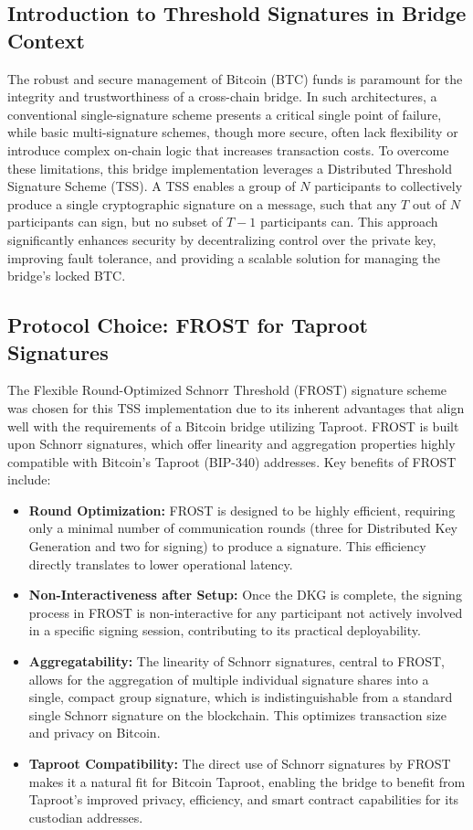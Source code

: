\documentclass{DESSThesis}
\begin{document}
\subsection{Introduction to Threshold Signatures in Bridge Context}
The robust and secure management of Bitcoin (BTC) funds is paramount for the integrity and trustworthiness of a cross-chain bridge. In such architectures, a conventional single-signature scheme presents a critical single point of failure, while basic multi-signature schemes, though more secure, often lack flexibility or introduce complex on-chain logic that increases transaction costs. To overcome these limitations, this bridge implementation leverages a Distributed Threshold Signature Scheme (TSS). A TSS enables a group of $N$ participants to collectively produce a single cryptographic signature on a message, such that any $T$ out of $N$ participants can sign, but no subset of $T-1$ participants can. This approach significantly enhances security by decentralizing control over the private key, improving fault tolerance, and providing a scalable solution for managing the bridge's locked BTC.

\subsection{Protocol Choice: FROST for Taproot Signatures}
The Flexible Round-Optimized Schnorr Threshold (FROST) signature scheme was chosen for this TSS implementation due to its inherent advantages that align well with the requirements of a Bitcoin bridge utilizing Taproot. FROST is built upon Schnorr signatures, which offer linearity and aggregation properties highly compatible with Bitcoin's Taproot (BIP-340) addresses. Key benefits of FROST include:
\begin{itemize}
    \item \textbf{Round Optimization:} FROST is designed to be highly efficient, requiring only a minimal number of communication rounds (three for Distributed Key Generation and two for signing) to produce a signature. This efficiency directly translates to lower operational latency.
    \item \textbf{Non-Interactiveness after Setup:} Once the DKG is complete, the signing process in FROST is non-interactive for any participant not actively involved in a specific signing session, contributing to its practical deployability.
    \item \textbf{Aggregatability:} The linearity of Schnorr signatures, central to FROST, allows for the aggregation of multiple individual signature shares into a single, compact group signature, which is indistinguishable from a standard single Schnorr signature on the blockchain. This optimizes transaction size and privacy on Bitcoin.
    \item \textbf{Taproot Compatibility:} The direct use of Schnorr signatures by FROST makes it a natural fit for Bitcoin Taproot, enabling the bridge to benefit from Taproot's improved privacy, efficiency, and smart contract capabilities for its custodian addresses.
\end{itemize}
\end{document}
